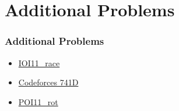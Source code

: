 \section{Additional Problems}

\begin{frame}
\frametitle{Additional Problems}
\begin{itemize}
    \item \href{https://oj.uz/problem/view/IOI11_race}{IOI11\_race}
    \item \href{https://codeforces.com/contest/741/problem/D}{Codeforces 741D}
    \item \href{https://oj.uz/problem/view/POI11_rot}{POI11\_rot}
\end{itemize}
\end{frame}